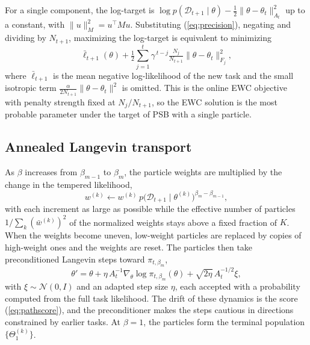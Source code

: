 For a single component, the log-target is
$\log p(\mathcal{D}_{t+1}\mid\theta)-\tfrac12\|\theta-\theta_t\|_{A_t}^2$ up to a
constant, with $\|u\|_M^2=u^{\top}Mu$. Substituting (\ref{eq:precision}),
negating and dividing by $N_{t+1}$, maximizing the log-target is equivalent to
minimizing
\begin{equation}
    \bar\ell_{t+1}(\theta)
    +\tfrac{1}{2}\textstyle\sum_{j=1}^{t}\gamma^{\,t-j}\tfrac{N_j}{N_{t+1}}
    \|\theta-\theta_t\|_{F_j}^{2},
    \label{eq:ewc}
\end{equation}
where $\bar\ell_{t+1}$ is the mean negative log-likelihood of the new task and
the small isotropic term $\tfrac{\alpha}{2N_{t+1}}\|\theta-\theta_t\|^2$ is
omitted. This is the online EWC
objective~\cite{kirkpatrick2017ewc,schwarz2018progress} with penalty strength
fixed at $N_j/N_{t+1}$, so the EWC solution is the most probable parameter under
the target of PSB with a single particle.

\subsection{Annealed Langevin transport}
\label{sec:langevin}

As $\beta$ increases from $\beta_{m-1}$ to $\beta_m$, the particle weights are
multiplied by the change in the tempered likelihood,
\begin{equation}
    w^{(k)}\leftarrow w^{(k)}\,
    p\big(\mathcal{D}_{t+1}\mid\theta^{(k)}\big)^{\beta_m-\beta_{m-1}},
    \label{eq:reweight}
\end{equation}
with each increment as large as possible while the effective number of
particles $1/\sum_k(\bar w^{(k)})^2$ of the normalized weights stays above a
fixed fraction of $K$. When the weights become uneven, low-weight particles are
replaced by copies of high-weight ones and the weights are reset. The particles
then take preconditioned Langevin steps toward $\pi_{t,\beta_m}$,
\begin{equation}
    \theta'=\theta+\eta\,A_t^{-1}\nabla_\theta\log\pi_{t,\beta_m}(\theta)
    +\sqrt{2\eta}\,A_t^{-1/2}\xi,
    \label{eq:mala}
\end{equation}
with $\xi\sim\mathcal{N}(0,I)$ and an adapted step size $\eta$, each accepted
with a probability computed from the full task likelihood. The drift of these
dynamics is the score (\ref{eq:pathscore}), and the preconditioner makes the
steps cautious in directions constrained by earlier tasks. At $\beta=1$, the
particles form the terminal population $\{\Theta_1^{(k)}\}$.


